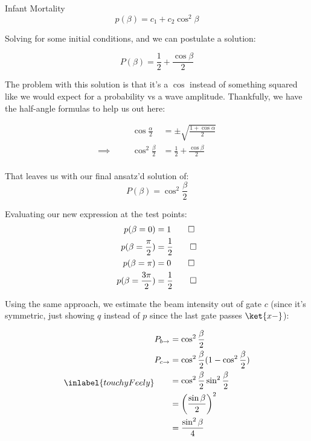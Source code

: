 \begin{answer}
\begin{answerpart}{Infant Mortality}
    \begin{equation}
      p(\beta) = c_1 + c_2\cos^2{\beta}
    \end{equation}

    Solving for some initial conditions, and we can postulate a
    solution:
    
    \begin{equation}
      P(\beta) = \frac{1}{2} + \frac{\cos{\beta}}{2}
    \end{equation}

    The problem with this solution is that it's a $\cos$ instead of
    something squared like we would expect for a probability vs a wave
    amplitude.  Thankfully, we have the half-angle formulas to help us
    out here:

    \begin{equation}
      \begin{alignedat}{2}
        & & \cos{\frac \alpha 2} &= \pm \sqrt{\frac{1 + \cos{\alpha}}{2}}\\
        \implies \quad & & \cos^2{\frac \beta 2} &= \frac{1}{2} + \frac{\cos{\beta}}{2}\\
      \end{alignedat}
    \end{equation}
    
    That leaves us with our final ansatz'd solution of:
    \begin{equation}
      P(\beta) = \cos^2{\frac \beta 2}
    \end{equation}
    
    Evaluating our new expression at the test points:
    \begin{equation}
      \begin{split}
        p(\beta=0) &= 1\qed\\
        p(\beta=\frac{\pi}{2}) &= \frac{1}{2}\qed\\
        p(\beta=\pi) &= 0\qed\\
        p(\beta=\frac{3\pi}{2}) &= \frac{1}{2}\qed\\
      \end{split}
    \end{equation}

    Using the same approach, we estimate the beam intensity out of
    gate $c$ (since it's symmetric, just showing $q$ instead of $p$
    since the last gate passes $\ket{x-}$):

    \begin{equation}
      \inlabel{touchyFeely}
      \begin{split}
        P_{b \rightarrow} &= \cos^2{\frac \beta 2}\\
        P_{c \rightarrow} &= \cos^2{\frac \beta 2} (1 - \cos^2{\frac \beta 2})\\
        &= \cos^2{\frac \beta 2} \sin^2{\frac \beta 2}\\
        &= \left(\frac{\sin{\beta}}{2}\right)^2\\
        &= \frac{\sin^2{\beta}}{4}\\
      \end{split}
    \end{equation}
    

\end{answerpart}
\end{answer}
